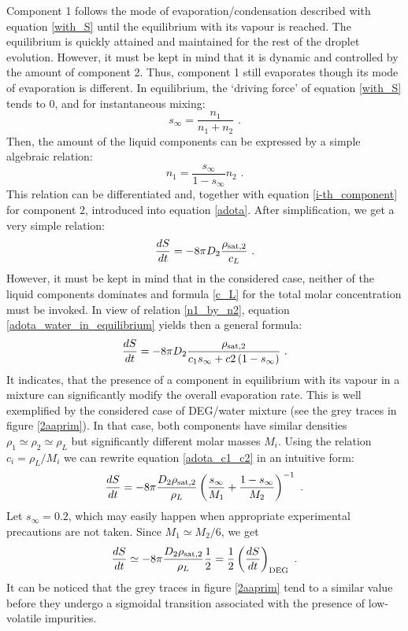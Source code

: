 \documentclass[twoside,twocolumn,9pt]{article}
\begin{document}
Component 1 follows the mode of evaporation/condensation described with equation \ref{with_S} until the equilibrium with its vapour is reached. The equilibrium is quickly attained and maintained for the rest of the droplet evolution. However, it must be kept in mind that it is dynamic and controlled by the amount of component 2. Thus, component 1 still evaporates though its mode of evaporation is different. In equilibrium, the `driving force' of equation \ref{with_S} tends to 0, and for instantaneous mixing:
\begin{equation}
s_{\infty} = \frac{n_1}{n_1+n_2} \mbox{~.}
\end{equation}
Then, the amount of the liquid components can be expressed by a simple algebraic relation:
\begin{equation}
n_1 = \frac{s_{\infty}}{1-s_{\infty}} n_2 \mbox{~.}
\label{n1_by_n2}
\end{equation}
This relation can be differentiated and, together with equation \ref{i-th_component} for component 2, introduced into equation \ref{adota}. After simplification, we get a very simple relation:
\begin{equation}
\frac{dS}{dt} = -8\pi D_2 \frac{\rho_{{\rm sat},2}}{c_L}  \mbox{~.}
\label{adota_water_in_equilibrium}
\end{equation}
However, it must be kept in mind that in the considered case, neither of the liquid components dominates and formula \ref{c_L} for the total molar concentration must be invoked. In view of relation \ref{n1_by_n2}, equation \ref{adota_water_in_equilibrium} yields then a general formula:
\begin{equation}
\frac{dS}{dt} = -8\pi D_2 \frac{\rho_{{\rm sat},2}}{c_1 s_\infty + c2 \left(1-s_\infty \right)}  \mbox{~.}
\label{adota_c1_c2}
\end{equation}
It indicates, that the presence of a component in equilibrium with its vapour in a mixture can significantly modify the overall evaporation rate.
This is well exemplified by the considered case of DEG/water mixture (see the grey traces in figure \ref{2aaprim}). In that case, both components have similar densities $\rho_1\simeq\rho_2\simeq \rho_L$ but significantly different molar masses $M_i$. Using the relation $c_i=\rho_L/M_i$ we can rewrite equation \ref{adota_c1_c2} in an intuitive form:
\begin{equation}
\frac{dS}{dt} = -8\pi \frac{D_2 \rho_{{\rm sat},2}}{\rho_L}\left(\frac{s_\infty}{M_1} + \frac{1-s_\infty}{M_2} \right)^{-1}  \mbox{~.}
\label{adota_M1_M2}
\end{equation}
Let $s_\infty=0.2$, which may easily happen when appropriate experimental precautions are not taken. Since $M_1\simeq M_2/6$, we get
\begin{equation}
\frac{dS}{dt} \simeq -8\pi \frac{D_2 \rho_{{\rm sat},2}}{\rho_L}\frac{1}{2} = \frac{1}{2} \left( \frac{dS}{dt} \right)_{\rm \small DEG} \mbox{~.}
\label{adota_estimation}
\end{equation}
It can be noticed that the grey traces in figure \ref{2aaprim} tend to a similar value before they undergo a sigmoidal transition associated with the presence of low-volatile impurities. 
\end{document}
